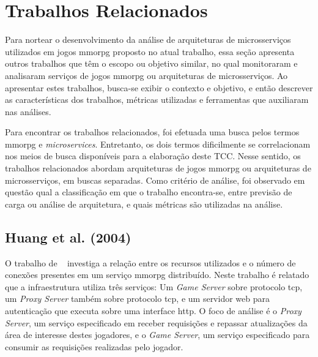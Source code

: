 \chapter{Trabalhos Relacionados}
\label{cap21}
\label{sec:similares}


Para nortear o desenvolvimento da análise de arquiteturas de microsserviços utilizados em jogos \ac{mmorpg} proposto no atual trabalho, essa seção apresenta outros trabalhos que têm o escopo ou objetivo similar, no qual monitoraram e analisaram serviços de jogos \ac{mmorpg} ou arquiteturas de microsserviços.
%
Ao apresentar estes trabalhos, busca-se exibir o contexto e objetivo, e então descrever as características dos trabalhos, métricas utilizadas e ferramentas que auxiliaram nas análises.


Para encontrar os trabalhos relacionados, foi efetuada uma busca pelos termos \ac{mmorpg} e \textit{microservices}.
%
Entretanto, os dois termos dificilmente se correlacionam nos meios de busca disponíveis para a elaboração deste TCC.
%
Nesse sentido, os trabalhos relacionados abordam arquiteturas de jogos \ac{mmorpg} ou arquiteturas de microsserviços, em buscas separadas.
%
Como critério de análise, foi observado em questão qual a classificação em que o trabalho encontra-se, entre previsão de carga ou análise de arquitetura, e quais métricas são utilizadas na análise.

\section{Huang et al. (2004)}
\label{sec:huang}



O trabalho de ~\cite{1417630} investiga a relação entre os recursos utilizados e o número de conexões presentes em um serviço \ac{mmorpg} distribuído.
%
Neste trabalho é relatado que a infraestrutura utiliza três serviços: Um \textit{Game Server} sobre protocolo \ac{tcp}, um \textit{Proxy Server} também sobre protocolo \ac{tcp}, e um servidor web para autenticação que executa sobre uma interface \ac{http}.
%
O foco de análise é o \textit{Proxy Server}, um serviço especificado em receber requisições e repassar atualizações da área de interesse destes jogadores, e o \textit{Game Server}, um serviço especificado para consumir as requisições realizadas pelo jogador.



